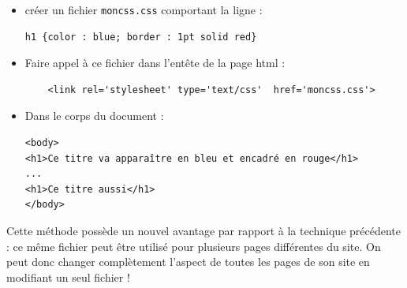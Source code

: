 \documentclass[11pt,a4paper]{article}
\begin{document}
\begin{itemize}
	\item créer un fichier \texttt{moncss.css}  comportant la ligne :
	      \begin{lstlisting}
h1 {color : blue; border : 1pt solid red}
\end{lstlisting}
	\item Faire appel à ce fichier dans l'entête de la page html :
	      \begin{lstlisting}
    <link rel='stylesheet' type='text/css'  href='moncss.css'>
\end{lstlisting}
	\item Dans le corps du document :
	      \begin{lstlisting}
<body>
<h1>Ce titre va apparaître en bleu et encadré en rouge</h1>
...
<h1>Ce titre aussi</h1>
</body>
\end{lstlisting}
\end{itemize}
Cette méthode possède un nouvel avantage par rapport à la technique précédente : ce même fichier peut être utilisé pour plusieurs pages différentes du site. On peut donc changer complètement l'aspect de toutes les pages de son site en modifiant un seul fichier !
\vspace{0.1cm}
\end{document}
